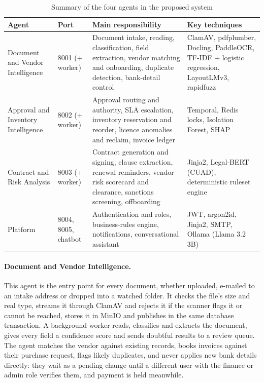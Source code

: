 \begin{table}[H]
\centering\tablestyle
\caption{Summary of the four agents in the proposed system}\label{tab:agents}
\begin{tabularx}{\textwidth}{|L{0.17\textwidth}|L{0.11\textwidth}|L{0.30\textwidth}|Y|}
\hline
\textbf{Agent} & \textbf{Port} & \textbf{Main responsibility} & \textbf{Key techniques} \\ \hline
Document and Vendor Intelligence & 8001 (+ worker) & Document intake, reading, classification, field extraction, vendor matching and onboarding, duplicate detection, bank-detail control & ClamAV, pdfplumber, Docling, PaddleOCR, TF-IDF + logistic regression, LayoutLMv3, rapidfuzz \\ \hline
Approval and Inventory Intelligence & 8002 (+ worker) & Approval routing and authority, SLA escalation, inventory reservation and reorder, licence anomalies and reclaim, invoice ledger & Temporal, Redis locks, Isolation Forest, SHAP \\ \hline
Contract and Risk Analysis & 8003 (+ worker) & Contract generation and signing, clause extraction, renewal reminders, vendor risk scorecard and clearance, sanctions screening, offboarding & Jinja2, Legal-BERT (CUAD), deterministic ruleset engine \\ \hline
Platform & 8004, 8005, chatbot & Authentication and roles, business-rules engine, notifications, conversational assistant & JWT, argon2id, Jinja2, SMTP, Ollama (Llama 3.2 3B) \\ \hline
\end{tabularx}
\end{table}

\paragraph{Document and Vendor Intelligence.} This agent is the entry point for every document, whether uploaded, e-mailed to an intake address or dropped into a watched folder. It checks the file's size and real type, streams it through ClamAV and rejects it if the scanner flags it or cannot be reached, stores it in MinIO and publishes  in the same database transaction. A background worker reads, classifies and extracts the document, gives every field a confidence score and sends doubtful results to a review queue. The agent matches the vendor against existing records, books invoices against their purchase request, flags likely duplicates, and never applies new bank details directly: they wait as a pending change until a different user with the finance or admin role verifies them, and payment is held meanwhile.

